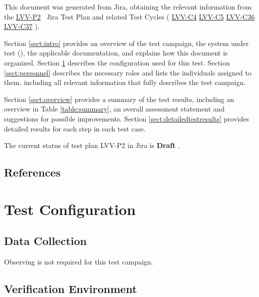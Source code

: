 \documentclass[DM,lsstdraft,STR,toc]{lsstdoc}
\begin{document}
This document was generated from Jira, obtaining the relevant information from the 
\href{https://jira.lsstcorp.org/secure/Tests.jspa#/testPlan/LVV-P2}{LVV-P2}
~Jira Test Plan and related Test Cycles (
  \href{https://jira.lsstcorp.org/secure/Tests.jspa#/testCycle/LVV-C4}{LVV-C4}
  \href{https://jira.lsstcorp.org/secure/Tests.jspa#/testCycle/LVV-C5}{LVV-C5}
  \href{https://jira.lsstcorp.org/secure/Tests.jspa#/testCycle/LVV-C36}{LVV-C36}
  \href{https://jira.lsstcorp.org/secure/Tests.jspa#/testCycle/LVV-C37}{LVV-C37}
).

Section \ref{sect:intro} provides an overview of the test campaign, the system under test (\product{}),
the applicable documentation, and explains how this document is organized.
Section \ref{sect:configuration}  describes the configuration used for this test.
Section \ref{sect:personnel} describes the necessary roles and lists the individuals assigned to them.
including all relevant information that fully describes the test campaign.

Section \ref{sect:overview} provides a summary of the test results, including an overview in Table \ref{table:summary},
an overall assessment statement and suggestions for possible improvements.
Section \ref{sect:detailedtestresults} provides detailed results for each step in each test case.

The current status of test plan LVV-P2 in Jira is \textbf{ Draft }.

\subsection{References}
\label{sect:references}
\renewcommand{\refname}{}

\section{Test Configuration}
\label{sect:configuration}

\subsection{Data Collection}

  Observing is not required for this test campaign.

\subsection{Verification Environment}
\label{sect:hwconf}
\end{document}
